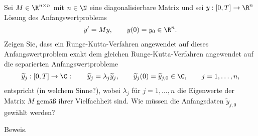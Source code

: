 \begin{exercise}
Sei $M \in \R^{n \times n}$ mit $n \in \N$ eine diagonalisierbare Matrix und sei
$y: [0,T] \rightarrow \R^n$ Lösung des Anfangswertproblems
\begin{align*}
  y^{\prime} = My, \qquad y(0) = y_0 \in \R^n.
\end{align*}
Zeigen Sie, dass ein Runge-Kutta-Verfahren angewendet auf dieses Anfangswertproblem
exakt dem gleichen Runge-Kutta-Verfahren angewendet auf die separierten Anfangswertprobleme
\begin{align*}
  \widetilde{y}_j: [0,T] \rightarrow \C: \qquad \widetilde{y}_j = \lambda_j\widetilde{y}_j,
  \qquad \widetilde{y}_j(0) = \widetilde{y}_{j,0} \in \C, \qquad j = 1,\dots,n,
\end{align*}
entspricht (in welchem Sinne?), wobei $\lambda_j$ für $j = 1,\dots,n$ die Eigenwerte
der Matrix $M$ gemäß ihrer Vielfachheit sind. Wie müssen die Anfangsdaten $\widetilde{y}_{j,0}$
gewählt werden?
\end{exercise}
\begin{solution}
Beweis.
\end{solution}
